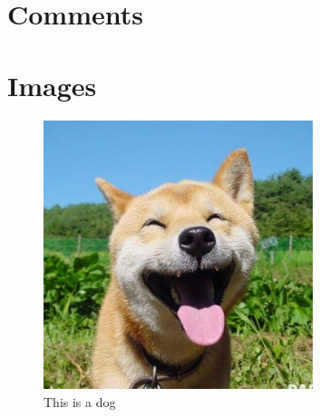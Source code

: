 \hypertarget{comments}{%
\section{Comments}\label{comments}}

\hypertarget{images}{%
\section{Images}\label{images}}

\begin{figure}
\centering
\includegraphics[width=0.7\textwidth,height=0.5\textheight]{images/dog.jpg}
\caption{This is a dog}
\end{figure}
